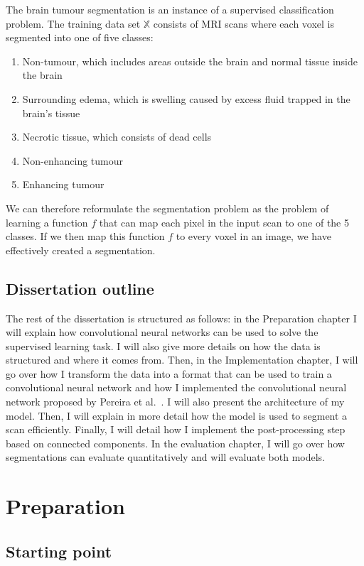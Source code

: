\documentclass[12pt,a4paper,twoside,openright]{report}
\begin{document}
The brain tumour segmentation is an instance of a supervised classification problem. The training data set $\mathbb{X}$ consists of MRI scans where each voxel is segmented into one of five classes:
\begin{enumerate}
	\item Non-tumour, which includes areas outside the brain and normal tissue inside the brain
	\item Surrounding edema, which is swelling caused by excess fluid trapped in the brain's tissue
	\item Necrotic tissue, which consists of dead cells
	\item Non-enhancing tumour
	\item Enhancing tumour
\end{enumerate} 
We can therefore reformulate the segmentation problem as the problem of learning a function $f$ that can map each pixel in the input scan to one of the 5 classes. If we then map this function $f$ to every voxel in an image, we have effectively created a segmentation.

\section{Dissertation outline}
The rest of the dissertation is structured as follows: in the Preparation chapter I will explain how convolutional neural networks can be used to solve the supervised learning task. I will also give more details on how the data is structured and where it comes from. Then, in the Implementation chapter, I will go over how I transform the data into a format that can be used to train a convolutional neural network and how I implemented the convolutional neural network proposed by Pereira et al.\ \cite{pereira}. I will also present the architecture of my model. Then, I will explain in more detail how the model is used to segment a scan efficiently. Finally, I will detail how I implement the post-processing step based on connected components. In the evaluation chapter, I will go over how segmentations can evaluate quantitatively and will evaluate both models.

\chapter{Preparation}

\section{Starting point}
\end{document}
